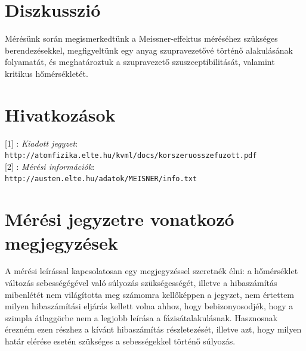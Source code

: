 \documentclass[12pt,a4paper]{article}
\begin{document}
\section{Diszkusszió}
\hspace*{10pt} Mérésünk során megismerkedtünk a Meissner-effektus méréséhez szükséges berendezésekkel, megfigyeltünk egy anyag szupravezetővé történő alakulásának folyamatát, és meghatároztuk a szupravezető szuszceptibilitását, valamint kritikus hőmérsékletét.

\section*{Hivatkozások}
\hspace*{14pt} [1] : \emph{Kiadott jegyzet}:\\
\hspace*{34pt} \texttt{http://atomfizika.elte.hu/kvml/docs/korszeruosszefuzott.pdf}\\
\hspace*{14pt} [2] : \emph{Mérési információk}:\\
\hspace*{34pt} \texttt{http://austen.elte.hu/adatok/MEISNER/info.txt}

\section*{Mérési jegyzetre vonatkozó megjegyzések}
\hspace*{10pt} A mérési leírással kapcsolatosan egy megjegyzéssel szeretnék élni: a hőmérséklet változás sebességégével való súlyozás szükségességét, illetve a hibaszámítás mibenlétét nem világította meg számomra kellőképpen a jegyzet, nem értettem milyen hibaszámítási eljárás kellett volna ahhoz, hogy bebizonyosodjék, hogy a szimpla átlaggörbe nem a legjobb leírása a fázisátalakulásnak. Hasznosnak érezném ezen részhez a kívánt hibaszámítás részletezését, illetve azt, hogy milyen határ elérése esetén szükséges a sebességekkel történő súlyozás.
\end{document}
